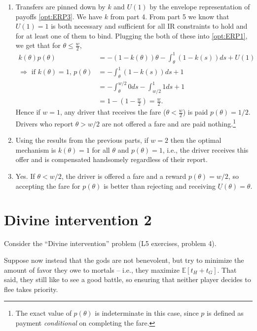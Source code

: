 \documentclass[a4paper]{article}
\begin{document}
\begin{enumerate}
	\item %
	Transfers are pinned down by $k$ and $U(1)$ by the envelope representation of payoffs \eqref{opt:ERP3}. We have $k$ from part 4. From part 5 we know that $U(1)=1$ is both necessary and sufficient for all IR constraints to hold and for at least one of them to bind. Plugging the both of these into \eqref{opt:ERP1}, we get that for $\theta \leq \frac{w}{2}$,
	\begin{align*}
		k(\theta)p(\theta) &= -(1-k(\theta)) \theta - \int_{\theta}^{1} (1-k(s)) ds + U(1)
		\\
		\Rightarrow \text{ if $k(\theta)=1$, } p(\theta) &= - \int_{\theta}^{1} (1-k(s)) ds + 1
		\\
		&= - \int_{\theta}^{w/2} 0 ds - \int_{w/2}^1 1 ds + 1
		\\
		&= 1 - \left(1-\frac{w}{2}\right) = \frac{w}{2}.
	\end{align*}
	Hence if $w=1$, any driver that receives the fare ($\theta < \frac{w}{2}$) is paid $p(\theta) = 1/2$. Drivers who report $\theta > w/2$ are not offered a fare and are paid nothing.\footnote{The exact value of $p(\theta)$ is indeterminate in this case, since $p$ is defined as payment \emph{conditional} on completing the fare.}
	
	\item Using the results from the previous parts, if $w=2$ then the optimal mechanism is $k(\theta) = 1$ for all $\theta$ and $p(\theta)=1$, i.e., the driver receives this offer and is compensated handsomely regardless of their report.
	
	\item Yes. If $\theta < w/2$, the driver is offered a fare and a reward $p(\theta) = w/2$, so accepting the fare for $p(\theta)$ is better than rejecting and receiving $\underline{U}(\theta)=\theta$.
\end{enumerate}
\fi



\section{Divine intervention 2}

Consider the ``Divine intervention'' problem (L5 exercises, problem 4).

Suppose now instead that the gods are not benevolent, but try to minimize the amount of favor they owe to mortals -- i.e., they maximize $\mathbb{E}[t_H+t_G]$. That said, they still like to see a good battle, so ensuring that neither player decides to flee takes priority.
\end{document}
